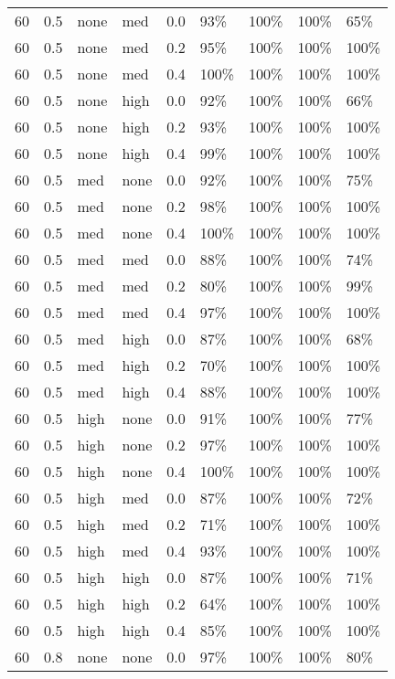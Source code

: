 \begin{longtable}{rrllrllll}
  60 & 0.5 & none & med & 0.0 & 93\% & 100\% & 100\% & 65\% \\ 
  60 & 0.5 & none & med & 0.2 & 95\% & 100\% & 100\% & 100\% \\ 
  60 & 0.5 & none & med & 0.4 & 100\% & 100\% & 100\% & 100\% \\ 
  60 & 0.5 & none & high & 0.0 & 92\% & 100\% & 100\% & 66\% \\ 
  60 & 0.5 & none & high & 0.2 & 93\% & 100\% & 100\% & 100\% \\ 
  60 & 0.5 & none & high & 0.4 & 99\% & 100\% & 100\% & 100\% \\ 
  60 & 0.5 & med & none & 0.0 & 92\% & 100\% & 100\% & 75\% \\ 
  60 & 0.5 & med & none & 0.2 & 98\% & 100\% & 100\% & 100\% \\ 
  60 & 0.5 & med & none & 0.4 & 100\% & 100\% & 100\% & 100\% \\ 
  60 & 0.5 & med & med & 0.0 & 88\% & 100\% & 100\% & 74\% \\ 
  60 & 0.5 & med & med & 0.2 & 80\% & 100\% & 100\% & 99\% \\ 
  60 & 0.5 & med & med & 0.4 & 97\% & 100\% & 100\% & 100\% \\ 
  60 & 0.5 & med & high & 0.0 & 87\% & 100\% & 100\% & 68\% \\ 
  60 & 0.5 & med & high & 0.2 & 70\% & 100\% & 100\% & 100\% \\ 
  60 & 0.5 & med & high & 0.4 & 88\% & 100\% & 100\% & 100\% \\ 
  60 & 0.5 & high & none & 0.0 & 91\% & 100\% & 100\% & 77\% \\ 
  60 & 0.5 & high & none & 0.2 & 97\% & 100\% & 100\% & 100\% \\ 
  60 & 0.5 & high & none & 0.4 & 100\% & 100\% & 100\% & 100\% \\ 
  60 & 0.5 & high & med & 0.0 & 87\% & 100\% & 100\% & 72\% \\ 
  60 & 0.5 & high & med & 0.2 & 71\% & 100\% & 100\% & 100\% \\ 
  60 & 0.5 & high & med & 0.4 & 93\% & 100\% & 100\% & 100\% \\ 
  60 & 0.5 & high & high & 0.0 & 87\% & 100\% & 100\% & 71\% \\ 
  60 & 0.5 & high & high & 0.2 & 64\% & 100\% & 100\% & 100\% \\ 
  60 & 0.5 & high & high & 0.4 & 85\% & 100\% & 100\% & 100\% \\ 
  60 & 0.8 & none & none & 0.0 & 97\% & 100\% & 100\% & 80\% \\ 

\end{longtable}
